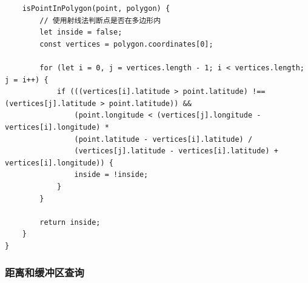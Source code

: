 \begin{lstlisting}
    isPointInPolygon(point, polygon) {
        // 使用射线法判断点是否在多边形内
        let inside = false;
        const vertices = polygon.coordinates[0];
        
        for (let i = 0, j = vertices.length - 1; i < vertices.length; j = i++) {
            if (((vertices[i].latitude > point.latitude) !== (vertices[j].latitude > point.latitude)) &&
                (point.longitude < (vertices[j].longitude - vertices[i].longitude) * 
                (point.latitude - vertices[i].latitude) / 
                (vertices[j].latitude - vertices[i].latitude) + vertices[i].longitude)) {
                inside = !inside;
            }
        }
        
        return inside;
    }
}
\end{lstlisting}

\subsubsection{距离和缓冲区查询}\label{ux8dddux79bbux548cux7f13ux51b2ux533aux67e5ux8be2}

